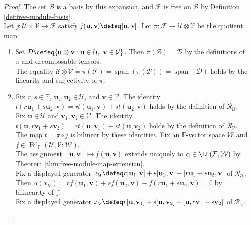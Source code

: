 \begin{theorem}
\begin{proof}
The set $\mathcal{B}$ is a basis by this expansion, and $\mathcal{F}$ is free on $\mathcal{B}$ by Definition \ref{def:free-module-basis}.\\
Let $j:\mathcal{U}\times\mathcal{V}\to\mathcal{F}$ satisfy $j(\mathbf{u},\mathbf{v})\defeq[\mathbf{u},\mathbf{v}]$. Let $\pi:\mathcal{F}\to\mathcal{U}\otimes\mathcal{V}$ be the quotient map.
\begin{enumerate}[label=(\roman*)]
\setlength{\itemsep}{0pt}
\item Set $\mathcal{D}\defeq\{\mathbf{u}\otimes\mathbf{v}:\mathbf{u}\in\mathcal{U},\ \mathbf{v}\in\mathcal{V}\}$. Then $\pi(\mathcal{B})=\mathcal{D}$ by the definitions of $\pi$ and decomposable tensors.\\
The equality $\mathcal{U}\otimes\mathcal{V}=\pi(\mathcal{F})=\operatorname{span}(\pi(\mathcal{B}))=\operatorname{span}(\mathcal{D})$ holds by the linearity and surjectivity of $\pi$.
\item Fix $r,s\in\mathbb{F}$, $\mathbf{u}_1,\mathbf{u}_2\in\mathcal{U}$, and $\mathbf{v}\in\mathcal{V}$. The identity $t(r\mathbf{u}_1+s\mathbf{u}_2,\mathbf{v})=rt(\mathbf{u}_1,\mathbf{v})+st(\mathbf{u}_2,\mathbf{v})$ holds by the definition of $\mathcal{R}_{\mathcal{U}}$.\\
Fix $\mathbf{u}\in\mathcal{U}$ and $\mathbf{v}_1,\mathbf{v}_2\in\mathcal{V}$. The identity $t(\mathbf{u},r\mathbf{v}_1+s\mathbf{v}_2)=rt(\mathbf{u},\mathbf{v}_1)+st(\mathbf{u},\mathbf{v}_2)$ holds by the definition of $\mathcal{R}_{\mathcal{V}}$.\\
The map $t=\pi\circ j$ is bilinear by these identities. Fix an $\mathbb{F}$-vector space $\mathcal{W}$ and $f\in\operatorname{Bil}_{\mathbb{F}}(\mathcal{U},\mathcal{V};\mathcal{W})$.\\
The assignment $[\mathbf{u},\mathbf{v}]\mapsto f(\mathbf{u},\mathbf{v})$ extends uniquely to $\alpha\in\LL(\mathcal{F},\mathcal{W})$ by Theorem \ref{thm:free-module-map-extension}.\\
Fix a displayed generator $x_{\mathcal{U}}\defeq r[\mathbf{u}_1,\mathbf{v}]+s[\mathbf{u}_2,\mathbf{v}]-[r\mathbf{u}_1+s\mathbf{u}_2,\mathbf{v}]$ of $\mathcal{R}_{\mathcal{U}}$.\\
Then $\alpha(x_{\mathcal{U}})=rf(\mathbf{u}_1,\mathbf{v})+sf(\mathbf{u}_2,\mathbf{v})-f(r\mathbf{u}_1+s\mathbf{u}_2,\mathbf{v})=0$ by bilinearity of $f$.\\
Fix a displayed generator $x_{\mathcal{V}}\defeq r[\mathbf{u},\mathbf{v}_1]+s[\mathbf{u},\mathbf{v}_2]-[\mathbf{u},r\mathbf{v}_1+s\mathbf{v}_2]$ of $\mathcal{R}_{\mathcal{V}}$.\\

\end{enumerate}
\end{proof}
\end{theorem}
